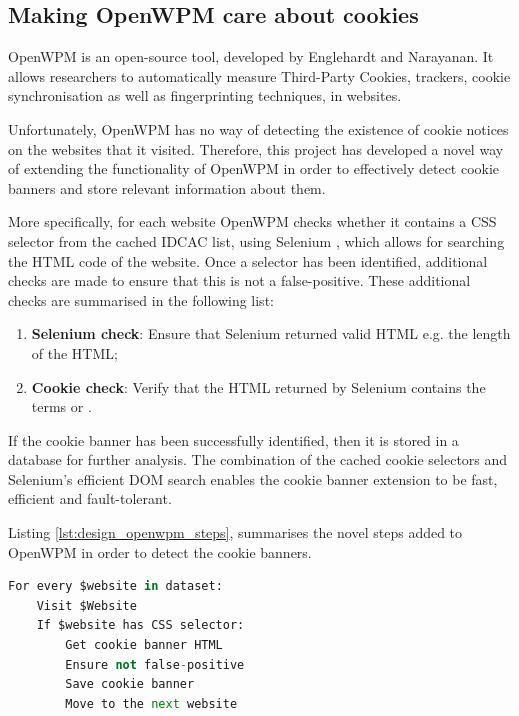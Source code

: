 \documentclass[../main.tex]{subfiles}
\begin{document}
\subsection{Making OpenWPM care about cookies}
OpenWPM is an open-source tool, developed by Englehardt and Narayanan. It allows researchers to automatically measure Third-Party Cookies, trackers, cookie synchronisation as well as fingerprinting techniques, in websites.

Unfortunately, OpenWPM has no way of detecting the existence of cookie notices on the websites that it visited. Therefore, this project has developed a novel way of extending the functionality of OpenWPM in order to effectively detect cookie banners and store relevant information about them. 

More specifically, for each website OpenWPM checks whether it contains a CSS selector from the cached IDCAC list, using Selenium \cite{selenium}, which allows for searching the HTML code of the website. Once a selector has been identified, additional checks are made to ensure that this is not a false-positive. These additional checks are summarised in the following list: 

\begin{enumerate}
    \item \textbf{Selenium check}: Ensure that Selenium returned valid HTML e.g. the length of the HTML;
    \item \textbf{Cookie check}: Verify that the HTML returned by Selenium contains the terms  or .
\end{enumerate}

If the cookie banner has been successfully identified, then it is stored in a database for further analysis. The combination of the cached cookie selectors and Selenium’s efficient DOM \cite{wood1998document} search enables the cookie banner extension to be fast, efficient and fault-tolerant. 

Listing \ref{lst:design_openwpm_steps}, summarises the novel steps added to OpenWPM in order to detect the cookie banners.

\begin{lstlisting}[language=Python, caption=Pseudocode of the steps that the OpenWPM extension uses., label=lst:design_openwpm_steps,captionpos=b, style=lst_style]
For every $website in dataset:
    Visit $Website
    If $website has CSS selector:
        Get cookie banner HTML
        Ensure not false-positive
        Save cookie banner
        Move to the next website
\end{lstlisting}
\end{document}
